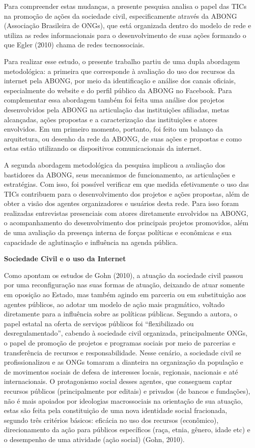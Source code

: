 Para compreender estas mudanças, a presente pesquisa analisa o papel das
TICs na promoção de ações da sociedade civil, especificamente através da
ABONG (Associação Brasileira de ONGs), que está organizada dentro do
modelo de rede e utiliza as redes informacionais para o desenvolvimento
de suas ações formando o que Egler (2010) chama de redes tecnossociais.

Para realizar esse estudo, o presente trabalho partiu de uma dupla
abordagem metodológica: a primeira que corresponde à avaliação do uso
dos recursos da internet pela ABONG, por meio da identificação e análise
dos canais oficiais, especialmente do website e do perfil público da
ABONG no Facebook. Para complementar essa abordagem também foi feita uma
análise dos projetos desenvolvidos pela ABONG na articulação das
instituições afiliadas, metas alcançadas, ações propostas e a
caracterização das instituições e atores envolvidos. Em um primeiro
momento, portanto, foi feito um balanço da arquitetura, ou desenho da
rede da ABONG, de suas ações e propostas e como estas estão utilizando
os dispositivos comunicacionais da internet.

A segunda abordagem metodológica da pesquisa implicou a avaliação dos
bastidores da ABONG, seus mecanismos de funcionamento, as articulações e
estratégias. Com isso, foi possível verificar em que medida efetivamente
o uso das TICs contribuem para o desenvolvimento dos projetos e ações
propostas, além de obter a visão dos agentes organizadores e usuários
desta rede. Para isso foram realizadas entrevistas presenciais com
atores diretamente envolvidos na ABONG, o acompanhamento do
desenvolvimento dos principais projetos promovidos, além de uma
avaliação da presença interna de forças políticas e econômicas e sua
capacidade de aglutinação e influência na agenda pública.

\textbf{Sociedade Civil e o uso da Internet}

Como apontam os estudos de Gohn (2010), a atuação da sociedade civil
passou por uma reconfiguração nas suas formas de atuação, deixando de
atuar somente em oposição ao Estado, mas também agindo em parceria ou em
substituição aos agentes públicos, ao adotar um modelo de ação mais
pragmático, voltado diretamente para a influência sobre as políticas
públicas. Segundo a autora, o papel estatal na oferta de serviços
públicos foi ``flexibilizado ou desregulamentado'', cabendo à sociedade
civil organizada, principalmente ONGs, o papel de promoção de projetos e
programas sociais por meio de parcerias e transferência de recursos e
responsabilidade. Nesse cenário, a sociedade civil se profissionalizou e
as ONGs tomaram a dianteira na organização da população e de movimentos
sociais de defesa de interesses locais, regionais, nacionais e até
internacionais. O protagonismo social desses agentes, que conseguem
captar recursos públicos (principalmente por editais) e privados (de
bancos e fundações), não é mais apoiados por ideologias macrossociais na
orientação de sua atuação, estas são feita pela constituição de uma nova
identidade social fracionada, segundo três critérios básicos: eficácia
no uso dos recursos (econômico), direcionamento da ação para públicos
específicos (raça, etnia, gênero, idade etc) e o desempenho de uma
atividade (ação social) (Gohn, 2010).

